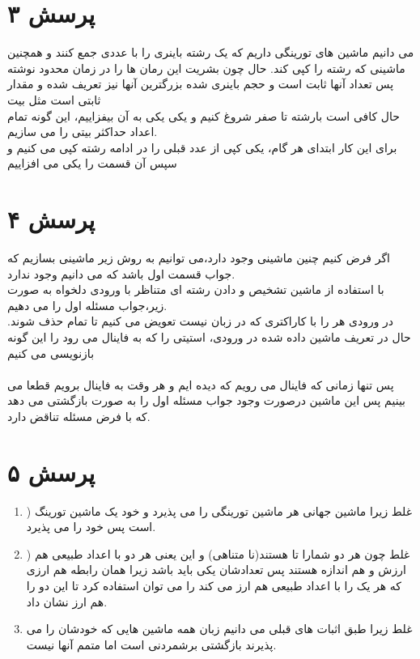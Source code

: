\documentclass[a4paper]{article}
\begin{document}
\pagebreak
\section*{پرسش ۳}
می دانیم ماشین های تورینگی داریم که یک رشته باینری را با عددی جمع کنند و همچنین ماشینی که رشته را کپی کند.
حال چون بشریت این رمان ها را در زمان محدود نوشته پس تعداد آنها ثابت است و حجم باینری شده بزرگترین آنها نیز تعریف شده و مقدار ثابتی است مثل  بیت\\
حال کافی است بارشته 
تا صفر شروغ کنیم و یکی یکی به آن بیفزاییم، این گونه تمام اعداد حداکثر
بیتی را می سازیم.\\
برای این کار ابتدای هر گام، یکی کپی از عدد قبلی را در ادامه رشته کپی می کنیم و سپس آن قسمت را یکی می افزاییم
\pagebreak

\section*{پرسش ۴}
اگر فرض کنیم چنین ماشینی وجود دارد،می توانیم به روش زیر ماشینی بسازیم که جواب قسمت اول باشد که می دانیم وجود ندارد.\\
با استفاده از ماشین تشخیص 
\lr{\#}
و دادن رشته ای متناظر با ورودی دلخواه به صورت زیر،جواب مسئله اول را می دهیم.\\
در ورودی هر 
\lr{\#}
را با کاراکتری که در زبان نیست تعویض می کنیم تا تمام
\lr{\#}
حذف شوند.
حال در تعریف ماشین داده شده در ورودی، استیتی را که به فاینال می رود را این گونه بازنویسی می کنیم\\
\\
پس تنها زمانی که فاینال می رویم که 
\lr{\#}
دیده ایم و هر وقت به فاینال برویم قطعا 
\lr{\#}
می بینیم
پس این ماشین درصورت وجود جواب مسئله اول را به صورت بازگشتی می دهد که با فرض مسئله تناقض دارد.
\pagebreak

\section*{پرسش ۵}
\begin{enumerate}[label=\Alph*]
\item{)}
غلط زیرا ماشین جهانی هر ماشین تورینگی را می پذیرد و خود یک ماشین تورینگ است پس خود را می پذیرد.
\item{)}
غلط چون هر دو شمارا تا هستند(نا متناهی) و این یعنی هر دو با اعداد طبیعی هم ارزش و هم اندازه هستند پس تعدادشان یکی باید باشد زیرا همان رابطه هم ارزی که هر یک را با اعداد طبیعی هم ارز می کند را می توان استفاده کرد تا این دو را هم ارز نشان داد.
\item{}
غلط زیرا طبق اثبات های قبلی می دانیم زبان همه ماشین هایی که خودشان را می پذیرند بازگشتی برشمردنی است اما متمم آنها نیست.
\end{enumerate}
\pagebreak
\end{document}
